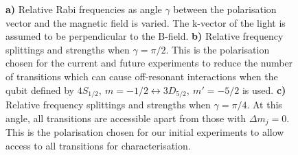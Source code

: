 \begin{figure}
{            \textbf{a)} Relative Rabi frequencies as angle $\gamma$ between the polarisation vector and the magnetic field is varied. The k-vector of the light is assumed to be perpendicular to the B-field.
            \textbf{b)} Relative frequency splittings and strengths when $\gamma = \pi/2$. This is the polarisation chosen for the current and future experiments to reduce the number of transitions which can cause off-resonant interactions when the qubit defined by $4S_{1/2},~m = -1/2 \leftrightarrow 3D_{5/2},~m' = -5/2$ is used.
            \textbf{c)} Relative frequency splittings and strengths when $\gamma = \pi/4$. At this angle, all transitions are accessible apart from those with $\Delta m_j = 0$. This is the polarisation chosen for our initial experiments to allow access to all transitions for characterisation.
            }
        \label{fig:quadrupole}
    \end{figure}

